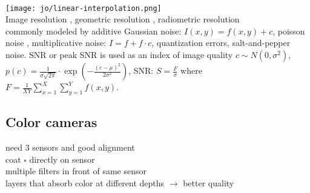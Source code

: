      \\
\texttt{[image: jo/linear-interpolation.png]} \\ 
 Image resolution , geometric resolution , radiometric resolution \\
 commonly modeled by additive Gaussian noise: $I(x, y) = f(x, y) + c$, poisson noise , multiplicative noise: $I = f + f \cdot c$, quantization errors, salt-and-pepper noise. SNR or peak SNR is used as an index of image quality $c \sim N(0, \sigma^2)$, $p(c) = \frac{1}{\sigma \sqrt{2\pi}} \cdot \exp\left(-\frac{(c - \mu)^2}{2\sigma^2}\right)$, SNR: $S = \frac{F}{\sigma}$ where $F = \frac{1}{XY}\sum_{x = 1}^X \sum_{y = 1}^{Y} f(x, y)$.
\subsection*{Color cameras}
 need 3 sensors and good alignment\\
 coat $\square$ directly on sensor \\
 multiple filters in front of same sensor\\
 layers that absorb color at different depths $\rightarrow$ better quality
